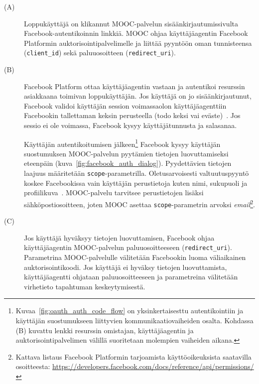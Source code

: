 \documentclass[finnish,gradu]{tktltiki}
\begin{document}
  \begin{description}
  \item[(A)]
   Loppukäyttäjä on klikannut MOOC-palvelun sisäänkirjautumissivulta Facebook-autentikoinnin linkkiä.
   MOOC ohjaa käyttäjäagentin Facebook Platformin auktorisointipalvelimelle ja liittää pyyntöön oman tunnisteensa (\verb!client_id!) sekä paluuosoitteen (\verb!redirect_uri!).

  \item[(B)]
  Facebook Platform ottaa käyttäjäagentin vastaan ja autentikoi resurssin asiakkaana toimivan loppukäyttäjän. Jos käyttäjä on jo sisäänkirjautunut, Facebook validoi käyttäjän session voimassaolon  käyttäjäagenttiin Facebookin tallettaman keksin perusteella (todo keksi vai eväste)~\cite{facebook_oauth2_doc}. Jos sessio ei ole voimassa, Facebook kysyy käyttäjätunnusta ja salasanaa.

  Käyttäjän autentikoitumisen jälkeen\footnote{
    Kuvaa~\ref{fig:oauth_auth_code_flow} on yksinkertaisesttu autentikointiin ja käyttäjän suostumukseen liittyvien kommunikaatiovaiheiden osalta. Kohdassa (B) kuvattu lenkki resurssin omistajan, käyttäjäagentin ja auktorisointipalvelimen välillä suoritetaan molempien vaiheiden aikana.
  }
  Facebook kysyy käyttäjän suostumuksen MOOC-palvelun pyytämien tietojen luovuttamiseksi eteenpäin (kuva~\ref{fig:facebook_auth_dialog}). Pyydettävien tietojen laajuus määritetään \verb!scope!-parametrilla. Oletusarvoisesti valtuutuspyyntö koskee Facebookissa vain käyttäjän perustietoja kuten nimi, sukupuoli ja profiilikuva~\cite{facebook_oauth2_doc}. MOOC-palvelu tarvitsee perustietojen lisäksi sähköpostiosoitteen, joten MOOC asettaa \verb!scope!-parametrin arvoksi \emph{email}\footnote{
    Kattava listaus Facebook Platformin tarjoamista käyttöoikeuksista saatavilla osoitteesta:
    \url{https://developers.facebook.com/docs/reference/api/permissions/}
  }.


  \item[(C)]

  Jos käyttäjä hyväksyy tietojen luovuttamisen, Facebook ohjaa käyttäjäagentin MOOC-palvelun paluuosoitteeseen (\verb!redirect_uri!). Parametrina MOOC-palvelulle välitetään Facebookin luoma väliaikainen auktorisointikoodi.
  Jos käyttäjä ei hyväksy tietojen luovuttamista, käyttäjäagentti ohjataan paluuosoitteeseen
  ja parametreina välitetään virhetieto tapahtuman keskeytymisestä.


\end{description}
\end{document}
